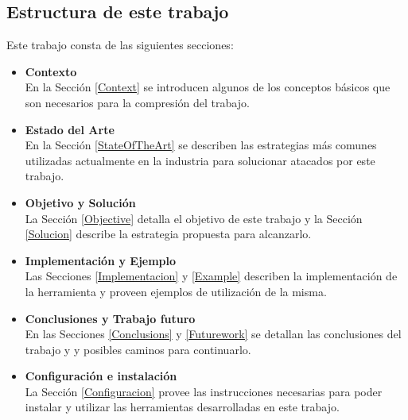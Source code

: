 \bigskip

\subsection{Estructura de este trabajo}
\noindent Este trabajo consta de las siguientes secciones:

\begin{itemize}
	\item \textbf{Contexto}\\
		En la Sección \ref{Context} se introducen algunos de los conceptos básicos que
		son necesarios para la compresión del trabajo.
	\item \textbf{Estado del Arte}\\
		En la Sección \ref{StateOfTheArt} se describen las estrategias más comunes
		utilizadas actualmente en la industria para solucionar atacados por este trabajo.
	\item \textbf{Objetivo y Solución}\\
		La Sección \ref{Objective} detalla el objetivo de este trabajo y la Sección
		\ref{Solucion} describe la estrategia propuesta para alcanzarlo.
	\item \textbf{Implementación y Ejemplo}\\
		Las Secciones \ref{Implementacion} y \ref{Example} describen la
		implementación de la herramienta y proveen ejemplos de utilización de la misma.
	\item \textbf{Conclusiones y Trabajo futuro}\\
		En las Secciones \ref{Conclusions} y \ref{Futurework} se detallan las
		conclusiones del trabajo y y posibles caminos para continuarlo.
	\item \textbf{Configuración e instalación}\\
		La Sección \ref{Configuracion} provee las instrucciones necesarias para poder instalar 
		y utilizar las herramientas desarrolladas en este trabajo. 
\end{itemize}
